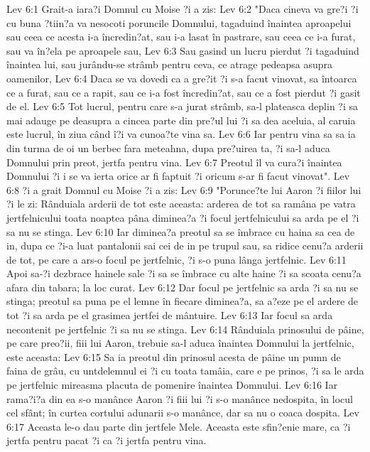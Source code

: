 Lev 6:1  Grait-a iara?i Domnul cu Moise ?i a zis:
Lev 6:2  "Daca cineva va gre?i ?i cu buna ?tiin?a va nesocoti poruncile Domnului, tagaduind înaintea aproapelui sau ceea ce acesta i-a încredin?at, sau i-a lasat în pastrare, sau ceea ce i-a furat, sau va în?ela pe aproapele sau,
Lev 6:3  Sau gasind un lucru pierdut ?i tagaduind înaintea lui, sau jurându-se strâmb pentru ceva, ce atrage pedeapsa asupra oamenilor,
Lev 6:4  Daca se va dovedi ca a gre?it ?i s-a facut vinovat, sa întoarca ce a furat, sau ce a rapit, sau ce i-a fost încredin?at, sau ce a fost pierdut ?i gasit de el.
Lev 6:5  Tot lucrul, pentru care s-a jurat strâmb, sa-l plateasca deplin ?i sa mai adauge pe deasupra a cincea parte din pre?ul lui ?i sa dea aceluia, al caruia este lucrul, în ziua când î?i va cunoa?te vina sa.
Lev 6:6  Iar pentru vina sa sa ia din turma de oi un berbec fara meteahna, dupa pre?uirea ta, ?i sa-l aduca Domnului prin preot, jertfa pentru vina.
Lev 6:7  Preotul îl va cura?i înaintea Domnului ?i i se va ierta orice ar fi faptuit ?i oricum s-ar fi facut vinovat".
Lev 6:8  ?i a grait Domnul cu Moise ?i a zis:
Lev 6:9  "Porunce?te lui Aaron ?i fiilor lui ?i le zi: Rânduiala arderii de tot este aceasta: arderea de tot sa ramâna pe vatra jertfelnicului toata noaptea pâna diminea?a ?i focul jertfelnicului sa arda pe el ?i sa nu se stinga.
Lev 6:10  Iar diminea?a preotul sa se îmbrace cu haina sa cea de in, dupa ce ?i-a luat pantalonii sai cei de in pe trupul sau, sa ridice cenu?a arderii de tot, pe care a ars-o focul pe jertfelnic, ?i s-o puna lânga jertfelnic.
Lev 6:11  Apoi sa-?i dezbrace hainele sale ?i sa se îmbrace cu alte haine ?i sa scoata cenu?a afara din tabara; la loc curat.
Lev 6:12  Dar focul pe jertfelnic sa arda ?i sa nu se stinga; preotul sa puna pe el lemne în fiecare diminea?a, sa a?eze pe el ardere de tot ?i sa arda pe el grasimea jertfei de mântuire.
Lev 6:13  Iar focul sa arda necontenit pe jertfelnic ?i sa nu se stinga.
Lev 6:14  Rânduiala prinosului de pâine, pe care preo?ii, fiii lui Aaron, trebuie sa-l aduca înaintea Domnului la jertfelnic, este aceasta:
Lev 6:15  Sa ia preotul din prinosul acesta de pâine un pumn de faina de grâu, cu untdelemnul ei ?i cu toata tamâia, care e pe prinos, ?i sa le arda pe jertfelnic mireasma placuta de pomenire înaintea Domnului.
Lev 6:16  Iar rama?i?a din ea s-o manânce Aaron ?i fiii lui ?i s-o manânce nedospita, în locul cel sfânt; în curtea cortului adunarii s-o manânce, dar sa nu o coaca dospita.
Lev 6:17  Aceasta le-o dau parte din jertfele Mele. Aceasta este sfin?enie mare, ca ?i jertfa pentru pacat ?i ca ?i jertfa pentru vina.
